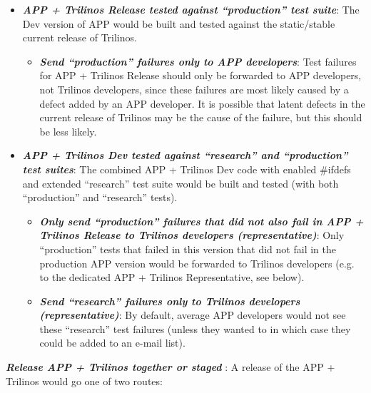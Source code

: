 \documentclass[pdf,ps2pdf,11pt]{SANDreport}
\begin{document}
  \begin{itemize}

  {}\item\textit{\textbf{APP + Trilinos Release tested against ``production''
  test suite}}: The Dev version of APP would be built and tested against the
  static/stable current release of Trilinos.

    \begin{itemize}

    {}\item\textit{\textbf{Send ``production'' failures only to APP
    developers}}: Test failures for APP + Trilinos Release should only be
    forwarded to APP developers, not Trilinos developers, since these failures
    are most likely caused by a defect added by an APP developer.  It is
    possible that latent defects in the current release of Trilinos may be the
    cause of the failure, but this should be less likely.

    \end{itemize}

  {}\item\textit{\textbf{APP + Trilinos Dev tested against ``research'' and
  ``production'' test suites}}: The combined APP + Trilinos Dev code with
  enabled {}\#ifdefs and extended ``research'' test suite would be built and
  tested (with both ``production'' and ``research'' tests).

    \begin{itemize}

    {}\item\textit{\textbf{Only send ``production'' failures that did not also
    fail in APP + Trilinos Release to Trilinos developers (representative)}}:
    Only ``production'' tests that failed in this version that did not fail in
    the production APP version would be forwarded to Trilinos developers
    (e.g. to the dedicated APP + Trilinos Representative, see below).

    {}\item\textit{\textbf{Send ``research'' failures only to Trilinos
    developers (representative)}}: By default, average APP developers would
    not see these ``research'' test failures (unless they wanted to in which
    case they could be added to an e-mail list).

    \end{itemize}
                
  \end{itemize}

{}\textit{\textbf{Release APP + Trilinos together or staged }}: A release of
the APP + Trilinos would go one of two routes:
\end{document}
